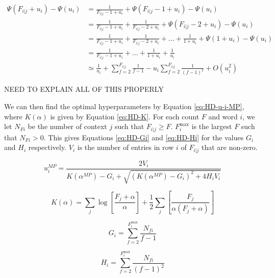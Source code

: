 \begin{align}
\Psi(F_{i|j}+u_{i})-\Psi(u_{i})&=\frac{1}{F_{i|j}-1+u_{i}}+\Psi(F_{i|j}-1+u_{i})-\Psi(u_{i}) \nonumber
\\
&=\frac{1}{F_{i|j}-1+u_{i}}+\frac{1}{F_{i|j}-2+u_{i}}+\Psi(F_{i|j}-2+u_{i})-\Psi(u_{i}) \nonumber
\\
&=\frac{1}{F_{i|j}-1+u_{i}}+\frac{1}{F_{i|j}-2+u_{i}}+...+\frac{1}{1+u_{i}}+\Psi(1+u_{i})-\Psi(u_{i}) \nonumber
\\
&=\frac{1}{F_{i|j}-1+u_{i}}+...+\frac{1}{1+u_{i}}+\frac{1}{u_{i}} \nonumber
\\
&\simeq \frac{1}{u_{i}}+\sum_{f=2}^{F_{i|j}}\frac{1}{f-1}-u_{i}\sum_{f=2}^{F_{i|j}}\frac{1}{(f-1)^{2}}+O(u_{i}^{2})
\label{eq:HD-digamma-F-u}
\end{align}

NEED TO EXPLAIN ALL OF THIS PROPERLY

We can then find the optimal hyperparameters by Equation \ref{eq:HD-u-i-MP}, where $K(\alpha)$ is given by Equation \ref{eq:HD-K}. For each count $F$ and word $i$, we let $N_{Fi}$ be the number of context $j$ such that $F_{i|j}\geq F$. $F_{i}^{\text{max}}$ is the largest $F$ such that $N_{Fi}>0$. This gives Equations \ref{eq:HD-Gi} and \ref{eq:HD-Hi} for the values $G_{i}$ and $H_{i}$ respectively. $V_{i}$ is the number of entries in row $i$ of $F_{i|j}$ that are non-zero.

\begin{equation}
u_{i}^{MP}=\frac{2V_{i}}{K(\alpha^{MP})-G_{i}+\sqrt{(K(\alpha^{MP})-G_{i})^{2}+4H_{i}V_{i}}}
\label{eq:HD-u-i-MP}
\end{equation}

\begin{equation}
K(\alpha)=\sum_{j}\log\left[\frac{F_{j}+\alpha}{\alpha}\right]+\frac{1}{2}\sum_{j}\left[\frac{F_{j}}{\alpha(F_{j}+\alpha)}\right]
\label{eq:HD-K}
\end{equation}

\begin{equation}
G_{i}=\sum_{f=2}^{F_{i}^{\text{max}}}\frac{N_{fi}}{f-1}
\label{eq:HD-Gi}
\end{equation}

\begin{equation}
H_{i}=\sum_{f=2}^{F_{i}^{\text{max}}}\frac{N_{fi}}{(f-1)^{2}}
\label{eq:HD-Hi}
\end{equation}

